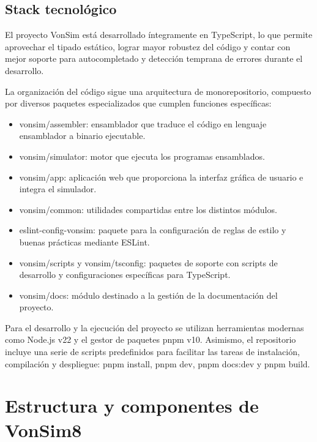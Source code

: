 \documentclass[12pt,oneside]{templates/unerthesis}
\providecommand{\tightlist}{%
  \setlength{\itemsep}{0pt}\setlength{\parskip}{0pt}}
\begin{document}
\hypertarget{stack-tecnoluxf3gico}{%
\subsection{Stack tecnológico}\label{stack-tecnoluxf3gico}}

El proyecto VonSim está desarrollado íntegramente en TypeScript, lo que permite aprovechar el tipado estático, lograr mayor robustez del código y contar con mejor soporte para autocompletado y detección temprana de errores durante el desarrollo.

La organización del código sigue una arquitectura de monorepositorio, compuesto por diversos paquetes especializados que cumplen funciones específicas:

\begin{itemize}
\tightlist
\item
  vonsim/assembler: ensamblador que traduce el código en lenguaje ensamblador a binario ejecutable.
\item
  vonsim/simulator: motor que ejecuta los programas ensamblados.
\item
  vonsim/app: aplicación web que proporciona la interfaz gráfica de usuario e integra el simulador.
\item
  vonsim/common: utilidades compartidas entre los distintos módulos.
\item
  eslint-config-vonsim: paquete para la configuración de reglas de estilo y buenas prácticas mediante ESLint.
\item
  vonsim/scripts y vonsim/tsconfig: paquetes de soporte con scripts de desarrollo y configuraciones específicas para TypeScript.
\item
  vonsim/docs: módulo destinado a la gestión de la documentación del proyecto.
\end{itemize}

Para el desarrollo y la ejecución del proyecto se utilizan herramientas modernas como Node.js v22 y el gestor de paquetes pnpm v10. Asimismo, el repositorio incluye una serie de scripts predefinidos para facilitar las tareas de instalación, compilación y despliegue: pnpm install, pnpm dev, pnpm docs:dev y pnpm build.

\hypertarget{estructura-y-componentes-de-vonsim8}{%
\section{Estructura y componentes de VonSim8}\label{estructura-y-componentes-de-vonsim8}}
\end{document}
